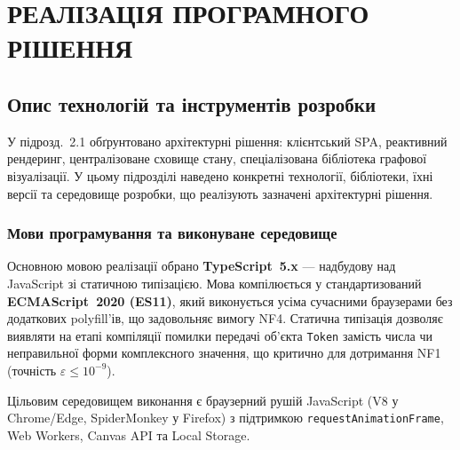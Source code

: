 ﻿%
\section{РЕАЛІЗАЦІЯ ПРОГРАМНОГО РІШЕННЯ}

%

\subsection{Опис технологій та інструментів розробки}

У підрозд.~2.1 обґрунтовано архітектурні рішення: клієнтський SPA,
реактивний рендеринг, централізоване сховище стану, спеціалізована
бібліотека графової візуалізації. У цьому підрозділі наведено
конкретні технології, бібліотеки, їхні версії та середовище розробки,
що реалізують зазначені архітектурні рішення.

\subsubsection*{Мови програмування та виконуване середовище}

Основною мовою реалізації обрано \textbf{TypeScript~5.x} --- надбудову
над JavaScript зі статичною типізацією. Мова компілюється у
стандартизований \textbf{ECMAScript~2020 (ES11)}, який виконується
усіма сучасними браузерами без додаткових polyfill'ів, що
задовольняє вимогу NF4. Статична типізація дозволяє виявляти на
етапі компіляції помилки передачі об'єкта \texttt{Token} замість
числа чи неправильної форми комплексного значення, що критично для
дотримання NF1 (точність $\varepsilon \le 10^{-9}$).

Цільовим середовищем виконання є браузерний рушій JavaScript
(V8 у Chrome/Edge, SpiderMonkey у Firefox) з підтримкою
\texttt{requestAnimationFrame}, Web Workers, Canvas API та Local
Storage.

